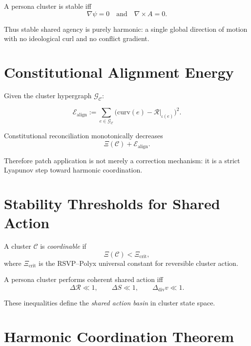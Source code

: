 \begin{theorem}
A persona cluster is stable iff
\[
\nabla\psi = 0
\quad\text{and}\quad
\nabla\times A = 0.
\]
\end{theorem}

Thus stable shared agency is purely harmonic:
a single global direction of motion with no ideological curl and no conflict gradient.


\section{Constitutional Alignment Energy}

Given the cluster hypergraph $\mathcal{G}_{\mathcal{C}}$:

\[
\mathcal{E}_{\mathrm{align}}
:=
\sum_{e\in\mathcal{G}_{\mathcal{C}}}
\bigl(
\mathrm{curv}(e)
-
\mathcal{R}|_{\iota(e)}
\bigr)^2.
\]

\begin{theorem}
Constitutional reconciliation monotonically decreases
\[
\Xi(\mathcal{C}) + \mathcal{E}_{\mathrm{align}}.
\]
\end{theorem}

Therefore patch application is not merely a correction mechanism:
it is a strict Lyapunov step toward harmonic coordination.


\section{Stability Thresholds for Shared Action}

\begin{definition}
A cluster $\mathcal{C}$ is \emph{coordinable} if
\[
\Xi(\mathcal{C}) < \Xi_{\mathrm{crit}},
\]
where $\Xi_{\mathrm{crit}}$ is the RSVP–Polyx universal constant for reversible cluster action.
\end{definition}

\begin{theorem}
A persona cluster performs coherent shared action iff
\[
\Delta\mathcal{R} \ll 1,
\qquad
\Delta S \ll 1,
\qquad
\Delta_{\mathrm{div}} v \ll 1.
\]
\end{theorem}

These inequalities define the \emph{shared action basin} in cluster state space.


\section{Harmonic Coordination Theorem}

